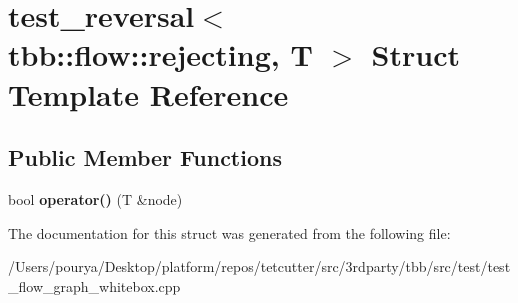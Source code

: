 \hypertarget{structtest__reversal_3_01tbb_1_1flow_1_1rejecting_00_01T_01_4}{}\section{test\+\_\+reversal$<$ tbb\+:\+:flow\+:\+:rejecting, T $>$ Struct Template Reference}
\label{structtest__reversal_3_01tbb_1_1flow_1_1rejecting_00_01T_01_4}
\subsection*{Public Member Functions}
\begin{DoxyCompactItemize}
\item 
\hypertarget{structtest__reversal_3_01tbb_1_1flow_1_1rejecting_00_01T_01_4_a6e0676b74f43ecc03c494780118457ed}{}bool {\bfseries operator()} (T \&node)\label{structtest__reversal_3_01tbb_1_1flow_1_1rejecting_00_01T_01_4_a6e0676b74f43ecc03c494780118457ed}

\end{DoxyCompactItemize}


The documentation for this struct was generated from the following file\+:\begin{DoxyCompactItemize}
\item 
/\+Users/pourya/\+Desktop/platform/repos/tetcutter/src/3rdparty/tbb/src/test/test\+\_\+flow\+\_\+graph\+\_\+whitebox.\+cpp\end{DoxyCompactItemize}
